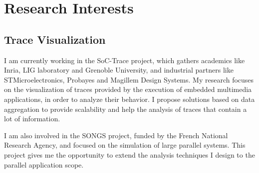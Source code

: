 \section{Research Interests}

\subsection{Trace Visualization}

%
{I am currently working in the SoC-Trace project, which gathers academics like 
Inria, LIG 
laboratory and Grenoble University, and industrial partners like 
STMicroelectronics, Probayes and 
Magillem Design Systems. My research focuses on the visualization of traces 
provided by 
the execution of embedded multimedia applications, in order to analyze their 
behavior. I propose solutions based on data aggregation to provide scalability 
and help the analysis of traces that contain a lot of information.}

%
{I am also involved in the SONGS project, funded by the French 
National Research Agency, and focused on the simulation of large parallel 
systems. This project gives me the opportunity to extend the analysis 
techniques I design to the parallel application scope.}